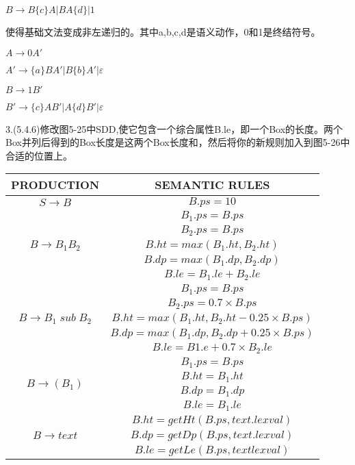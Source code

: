 \documentclass[a4paper, 10pt]{article}
\begin{document}
$B \rightarrow  B\{c\}A | BA\{d\} | 1$

使得基础文法变成非左递归的。其中a,b,c,d是语义动作，0和1是终结符号。

$A\rightarrow 0A'$

$A' \rightarrow \{a\}BA' | B\{b\}A' | \varepsilon$

$B\rightarrow 1B'$

$B' \rightarrow  \{c\}AB' | A\{d\}B' | \varepsilon$


3.(5.4.6)修改图5-25中SDD,使它包含一个综合属性B.le，即一个Box的长度。两个Box并列后得到的Box长度是这两个Box长度和，然后将你的新规则加入到图5-26中合适的位置上。
\begin{table}[H]
\centering

\begin{tabular}{|c|c|}
\hline
\hline
PRODUCTION & SEMANTIC RULES\\
\hline
\multirow{1}{*}{$S\rightarrow B $} & $B.ps = 10$ \\
\hline
\multirow{5}{*}{$B\rightarrow B_1B_2 $} & $B_1.ps = B.ps$ \\
& $B_2.ps = B.ps$\\
& $B.ht = max(B_1.ht, B_2.ht)$\\
& $B.dp = max(B_1.dp, B_2.dp)$\\
& $B.le = B_1.le + B_2.le$\\
\hline
\multirow{5}{*}{$B\rightarrow B_1 \;sub\; B_2$} & $B_1.ps = B.ps$\\
& $B_2.ps = 0.7 \times B.ps$\\
& $B.ht = max(B_1.ht, B_2.ht - 0.25\times B.ps)$\\
& $B.dp = max(B_1.dp,B_2.dp + 0.25\times B.ps)$\\
& $B.le = B1.e + 0.7\times B_2.le$\\
\hline
\multirow{4}{*}{$B\rightarrow (B_1)$} & $B_1.ps = B.ps$\\
& $B.ht = B_1.ht$\\
& $B.dp = B_1.dp$\\
& $B.le = B_1.le$\\
\hline
\multirow{3}{*}{$B\rightarrow text$} & $B.ht = getHt(B.ps, text.lexval)$\\
&$B.dp = getDp(B.ps, text.lexval)$\\
& $B.le = getLe(B.ps, textlexval)$\\

\hline
\end{tabular}
\end{table}
\end{document}
